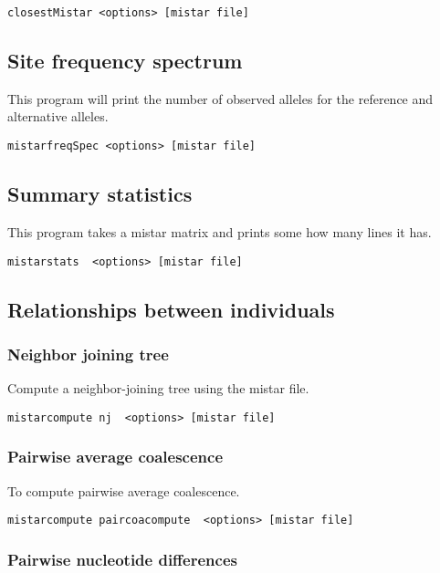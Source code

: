 \documentclass[a4paper]{article}
\begin{document}
\begin{verbatim}
closestMistar <options> [mistar file]
\end{verbatim}

\subsection{Site frequency spectrum}

This program will print the number of observed alleles for the reference and alternative alleles.

\begin{verbatim}
mistarfreqSpec <options> [mistar file]
\end{verbatim}

\subsection{Summary statistics}

This program takes a mistar matrix and prints some how many lines it has.
\begin{verbatim}
mistarstats  <options> [mistar file]
\end{verbatim}


\subsection{Relationships between individuals}


\subsubsection{Neighbor joining tree}

Compute a neighbor-joining tree using the mistar file.

\begin{verbatim}
mistarcompute nj  <options> [mistar file]
\end{verbatim}

\subsubsection{Pairwise average coalescence}

To compute pairwise average coalescence.
\begin{verbatim}
mistarcompute paircoacompute  <options> [mistar file]
\end{verbatim}

\subsubsection{Pairwise nucleotide differences}
\end{document}
